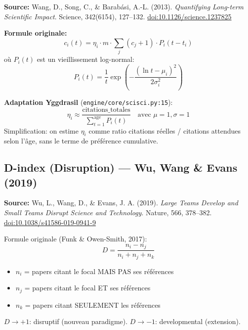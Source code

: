 \documentclass[11pt,a4paper]{article}
\begin{document}
\textbf{Source:} Wang, D., Song, C., \& Barab\'asi, A.-L. (2013).
\textit{Quantifying Long-term Scientific Impact}.
Science, 342(6154), 127--132.
\href{https://doi.org/10.1126/science.1237825}{doi:10.1126/science.1237825}

\textbf{Formule originale:}
\begin{equation}
c_i(t) = \eta_i \cdot m \cdot \sum_j (c_j + 1) \cdot P_i(t - t_i)
\end{equation}
o\`u $P_i(t)$ est un vieillissement log-normal:
\begin{equation}
P_i(t) = \frac{1}{t} \exp\!\left(-\frac{(\ln t - \mu_i)^2}{2\sigma_i^2}\right)
\end{equation}

\textbf{Adaptation Yggdrasil} (\texttt{engine/core/scisci.py:15}):
\begin{equation}
\eta_i \approx \frac{\text{citations\_totales}}{\sum_{t=1}^{\text{age}} P_i(t)}
\quad\text{avec } \mu=1, \sigma=1
\end{equation}
Simplification: on estime $\eta_i$ comme ratio citations r\'eelles / citations attendues
selon l'\^age, sans le terme de pr\'ef\'erence cumulative.

\subsection{D-index (Disruption) --- Wu, Wang \& Evans (2019)}

\textbf{Source:} Wu, L., Wang, D., \& Evans, J. A. (2019).
\textit{Large Teams Develop and Small Teams Disrupt Science and Technology}.
Nature, 566, 378--382.
\href{https://doi.org/10.1038/s41586-019-0941-9}{doi:10.1038/s41586-019-0941-9}

Formule originale (Funk \& Owen-Smith, 2017):
\begin{equation}
D = \frac{n_i - n_j}{n_i + n_j + n_k}
\end{equation}
\begin{itemize}
\item $n_i$ = papers citant le focal MAIS PAS ses r\'ef\'erences
\item $n_j$ = papers citant le focal ET ses r\'ef\'erences
\item $n_k$ = papers citant SEULEMENT les r\'ef\'erences
\end{itemize}
$D \to +1$: disruptif (nouveau paradigme).
$D \to -1$: developmental (extension).
\end{document}
